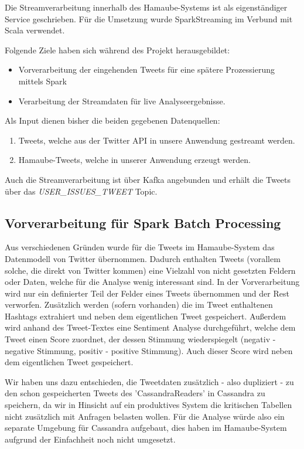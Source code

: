Die Streamverarbeitung innerhalb des Hamaube-Systems ist als eigenständiger Service geschrieben. Für die Umsetzung wurde SparkStreaming im Verbund mit Scala verwendet.

Folgende Ziele haben sich während des Projekt herausgebildet:
\begin{itemize}
	\item Vorverarbeitung der eingehenden Tweets für eine spätere Prozessierung mittels Spark
	\item Verarbeitung der Streamdaten für live Analyseergebnisse.
\end{itemize}


Als Input dienen bisher die beiden gegebenen Datenquellen:
\begin{enumerate}
	\item Tweets, welche aus der Twitter API in unsere Anwendung gestreamt werden.
	\item Hamaube-Tweets, welche in unserer Anwendung erzeugt werden.
\end{enumerate}

Auch die Streamverarbeitung ist über Kafka angebunden und erhält die Tweets über das \textit{USER\_ISSUES\_TWEET} Topic.


\subsection*{Vorverarbeitung für Spark Batch Processing}
Aus verschiedenen Gründen wurde für die Tweets im Hamaube-System das Datenmodell von Twitter übernommen.
Dadurch enthalten Tweets (vorallem solche, die direkt von Twitter kommen) eine Vielzahl von nicht gesetzten Feldern oder Daten, welche für die Analyse wenig interessant sind.
In der Vorverarbeitung wird nur ein definierter Teil der Felder eines Tweets übernommen und der Rest verworfen.
Zusätzlich werden (sofern vorhanden) die im Tweet enthaltenen Hashtags extrahiert und neben dem eigentlichen Tweet gespeichert.
Außerdem wird anhand des Tweet-Textes eine Sentiment Analyse durchgeführt, welche dem Tweet einen Score zuordnet, der dessen Stimmung wiederspiegelt (negativ - negative Stimmung, positiv - positive Stimmung). Auch dieser Score wird neben dem eigentlichen Tweet gespeichert.

Wir haben uns dazu entschieden, die Tweetdaten zusätzlich - also dupliziert - zu den schon gespeicherten Tweets des 'CassandraReaders' in Cassandra zu speichern, da wir in Hinsicht auf ein produktives System die kritischen Tabellen nicht zusätzlich mit Anfragen belasten wollen.
Für die Analyse würde also ein separate Umgebung für Cassandra aufgebaut, dies haben im Hamaube-System aufgrund der Einfachheit noch nicht umgesetzt.

